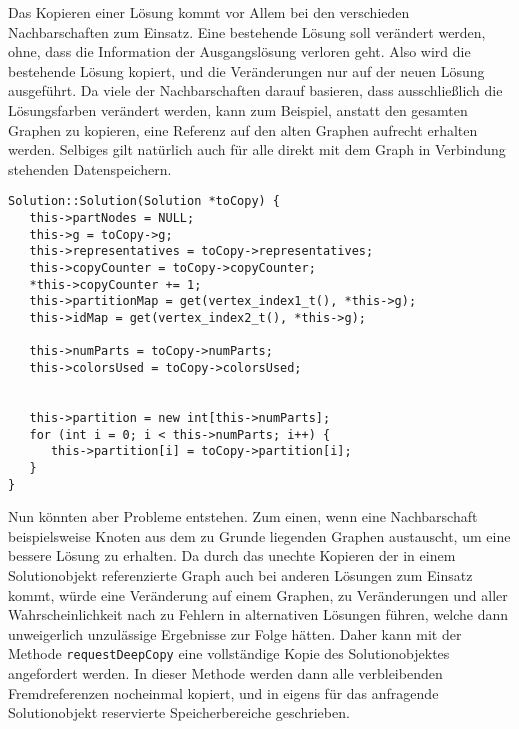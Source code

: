 Das Kopieren einer Lösung kommt vor Allem bei den verschieden Nachbarschaften zum Einsatz. Eine bestehende Lösung soll verändert werden, ohne, dass die Information der Ausgangslösung verloren geht. Also wird
die bestehende Lösung kopiert, und die Veränderungen nur auf der neuen Lösung ausgeführt. Da viele der Nachbarschaften darauf basieren, dass ausschließlich die Lösungsfarben verändert werden, kann zum Beispiel, 
anstatt den gesamten Graphen zu kopieren, eine Referenz auf den alten Graphen aufrecht erhalten werden. Selbiges gilt natürlich auch für alle direkt mit dem Graph in Verbindung stehenden Datenspeichern. 

\singlespacing
\begin{lstlisting}[caption={Der Kopierkonstruktor der Solutionklasse},label={lst:copy}]
Solution::Solution(Solution *toCopy) {
   this->partNodes = NULL;
   this->g = toCopy->g;
   this->representatives = toCopy->representatives;
   this->copyCounter = toCopy->copyCounter;
   *this->copyCounter += 1;
   this->partitionMap = get(vertex_index1_t(), *this->g);
   this->idMap = get(vertex_index2_t(), *this->g);   
   
   this->numParts = toCopy->numParts;
   this->colorsUsed = toCopy->colorsUsed;

   
   this->partition = new int[this->numParts];
   for (int i = 0; i < this->numParts; i++) {
      this->partition[i] = toCopy->partition[i];
   }
}
\end{lstlisting}

Nun könnten aber Probleme entstehen. Zum einen, wenn eine Nachbarschaft beispielsweise Knoten aus dem zu Grunde liegenden Graphen austauscht, um eine bessere Lösung zu erhalten. Da durch das unechte Kopieren
der in einem Solutionobjekt referenzierte Graph auch bei anderen Lösungen zum Einsatz kommt, würde eine Veränderung auf einem Graphen, zu Veränderungen und aller Wahrscheinlichkeit nach zu Fehlern in alternativen
Lösungen führen, welche dann unweigerlich unzulässige Ergebnisse zur Folge hätten. Daher kann mit der Methode \texttt{requestDeepCopy} eine vollständige Kopie des Solutionobjektes angefordert werden. In dieser
Methode werden dann alle verbleibenden Fremdreferenzen nocheinmal kopiert, und in eigens für das anfragende Solutionobjekt reservierte Speicherbereiche geschrieben.

